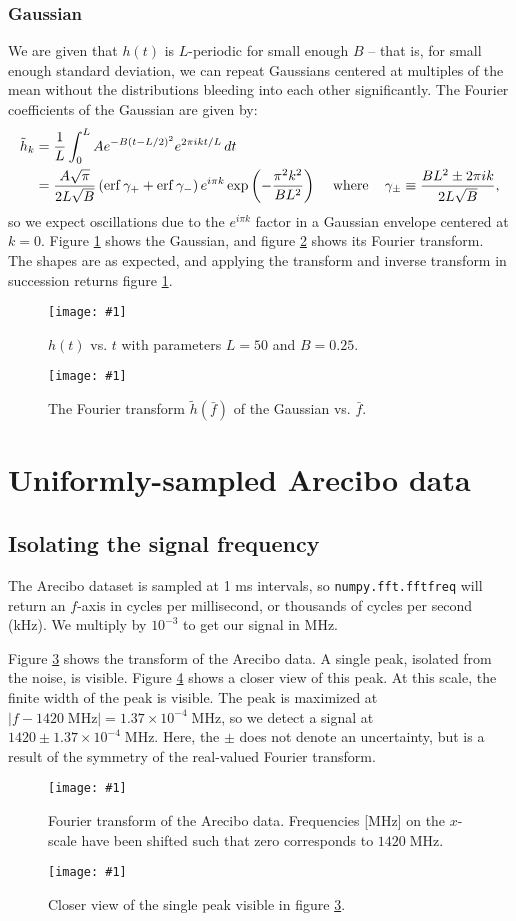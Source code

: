 \documentclass{article}
\theoremstyle{definition}
\newcommand{\un}[1]{\;\mathrm{#1}}
\renewcommand{\sp}[1]{\;\;\;\text{ #1 }\;\;\;}
\newcommand{\cc}{\texttt}
\newcommand{\plop}[2]{
    \begin{figure}\centering
        \texttt{[image: \#1]}
        \caption{\label{#1}#2}
    \end{figure}
}
\begin{document}
\subsubsection{Gaussian}

We are given that $h(t)$ is $L$-periodic for small enough $B$ -- that is,
for small enough standard deviation, we can repeat Gaussians
centered at multiples of the mean without the distributions bleeding into
each other significantly. The Fourier coefficients of the Gaussian
are given by:
\begin{align*}
\tilde h_k &= {1 \over L} \int_0^L A e^{-B (t - L/2)^2}
e^{2\pi i k t / L} \, dt \\
&=
{A\sqrt\pi \over 2L \sqrt B}
\left(
    \erf \gamma_+ + \erf \gamma_-
\right)
e^{i\pi k}
\exp\left(
    -{\pi^2 k^2 \over B L^2}
\right)
\sp{where}
\gamma_{\pm} \equiv {BL^2 \pm 2\pi i k \over 2L \sqrt B},
\end{align*}
so we expect oscillations due to the $e^{i\pi k}$ factor
in a Gaussian envelope centered at $k = 0$.
Figure \ref{h.pdf} shows the Gaussian, and figure \ref{Fh.pdf} shows
its Fourier transform. The shapes are as expected, and applying the transform
and inverse transform in succession returns figure \ref{h.pdf}.
\plop{h.pdf}{$h(t)$ vs. $t$ with parameters $L = 50$ and $B = 0.25$.}
\plop{Fh.pdf}{The Fourier transform $\tilde h(\bar f)$ of the Gaussian
vs. $\bar f$.}

\section{Uniformly-sampled Arecibo data}

\subsection{Isolating the signal frequency}

The Arecibo dataset is sampled at 1 ms intervals, so \cc{numpy.fft.fftfreq}
will return an $f$-axis in cycles per millisecond, or thousands
of cycles per second (kHz). We multiply
by $10^{-3}$ to get our signal in MHz.

Figure \ref{Fa1.pdf} shows the transform of the Arecibo data. A single peak,
isolated from the noise, is visible. Figure \ref{Fa1_scaled.pdf} shows
a closer view of this peak. At this scale, the finite width of the peak
is visible. The peak is maximized at $|f - 1420\un{MHz}| =
1.37 \times 10^{-4}\un{MHz}$,
so we detect a signal at $1420 \pm 1.37 \times 10^{-4}
\un{MHz}$. Here, the $\pm$ does not denote an uncertainty, but is a result
of the symmetry of the real-valued Fourier transform.
\plop{Fa1.pdf}{Fourier transform of the Arecibo data. Frequencies [MHz]
on the $x$-scale have been shifted such that zero corresponds to
$1420\un{MHz}$.}
\plop{Fa1_scaled.pdf}{Closer view of the single peak visible in figure
\ref{Fa1.pdf}.}
\end{document}
